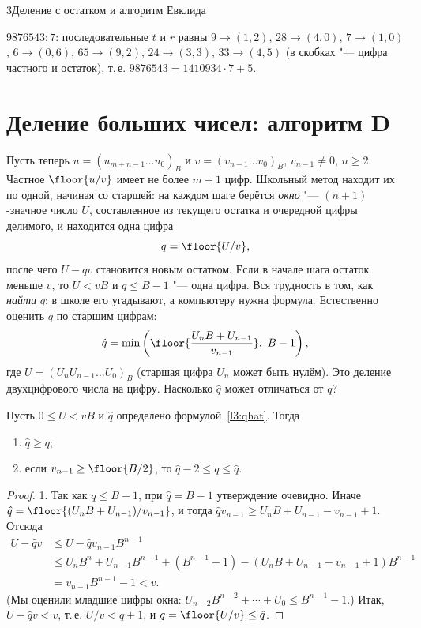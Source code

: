 \begin{lecture}{3}{Деление с остатком и алгоритм Евклида}
\begin{example}
$9876543 : 7$: последовательные $t$ и $r$ равны
$9 \to (1, 2)$, $28 \to (4, 0)$, $7 \to (1, 0)$, $6 \to (0, 6)$, $65 \to (9, 2)$, $24 \to (3, 3)$,
$33 \to (4, 5)$ (в скобках "--- цифра частного и остаток), т.\,е. $9876543 = 1410934 \cdot 7 + 5$.
\end{example}

\section{Деление больших чисел: алгоритм D}

Пусть теперь $u = (u_{m+n-1} \dots u_0)_B$ и $v = (v_{n-1} \dots v_0)_B$, $v_{n-1} \ne 0$,
$n \ge 2$. Частное $\floor{u/v}$ имеет не более $m + 1$ цифр. Школьный метод находит их по одной,
начиная со старшей: на каждом шаге берётся \emph{окно} "--- $(n + 1)$-значное число $U$,
составленное из текущего остатка и очередной цифры делимого, и находится одна цифра
\[
  q = \floor{U / v},
\]
после чего $U - qv$ становится новым остатком. Если в начале шага остаток меньше $v$, то
$U < vB$ и $q \le B - 1$ "--- одна цифра. Вся трудность в том, как \emph{найти} $q$: в школе его
угадывают, а компьютеру нужна формула. Естественно оценить $q$ по старшим цифрам:
\begin{equation}\label{l3:qhat}
  \hat q = \min\left(\floor{\frac{U_n B + U_{n-1}}{v_{n-1}}},\ B - 1\right),
\end{equation}
где $U = (U_n U_{n-1} \dots U_0)_B$ (старшая цифра $U_n$ может быть нулём). Это деление
двухцифрового числа на цифру. Насколько $\hat q$ может отличаться от $q$?

\begin{theorem}[Кнут]\label{l3:qhat-thm}
Пусть $0 \le U < vB$ и $\hat q$ определено формулой~\eqref{l3:qhat}. Тогда
\begin{enumerate}
  \item $\hat q \ge q$;
  \item если $v_{n-1} \ge \floor{B/2}$, то $\hat q - 2 \le q \le \hat q$.
\end{enumerate}
\end{theorem}

\begin{proof}
1. Так как $q \le B - 1$, при $\hat q = B - 1$ утверждение очевидно. Иначе
$\hat q = \floor{(U_n B + U_{n-1})/v_{n-1}}$, и тогда $\hat q v_{n-1} \ge U_n B + U_{n-1} - v_{n-1} + 1$.
Отсюда
\[
\begin{aligned}
  U - \hat q v &\le U - \hat q v_{n-1} B^{n-1}\\
  &\le U_n B^n + U_{n-1} B^{n-1} + (B^{n-1} - 1) - (U_n B + U_{n-1} - v_{n-1} + 1) B^{n-1}\\
  &= v_{n-1} B^{n-1} - 1 < v.
\end{aligned}
\]
(Мы оценили младшие цифры окна: $U_{n-2} B^{n-2} + \cdots + U_0 \le B^{n-1} - 1$.) Итак,
$U - \hat q v < v$, т.\,е. $U/v < \hat q + 1$, и $q = \floor{U/v} \le \hat q$.


\end{proof}
\end{lecture}
